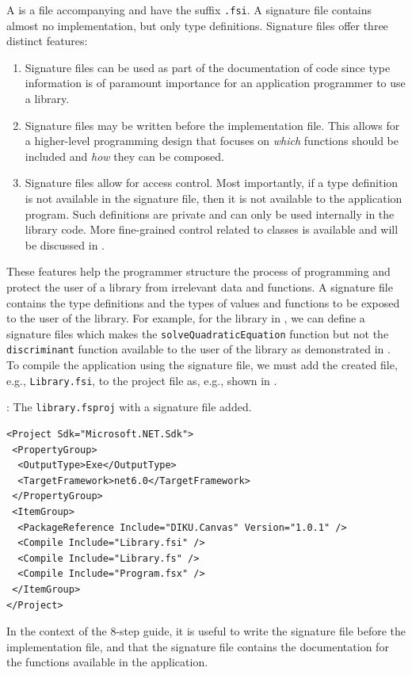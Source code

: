 \documentclass[fsharpNotes.tex]{subfiles}
\begin{document}
A  is a file accompanying  and have the suffix \lstinline[language=console]{.fsi}. A signature file contains almost no implementation, but only type definitions. Signature files offer three distinct features:
\begin{enumerate}
\item Signature files can be used as part of the documentation of code since type information is of paramount importance for an application programmer to use a library. 
\item Signature files may be written before the implementation file. This allows for a higher-level programming design that focuses on \emph{which} functions should be included and \emph{how} they can be composed.
\item Signature files allow for access control. Most importantly, if a type definition is not available in the signature file, then it is not available to the application program. Such definitions are private and can only be used internally in the library code. More fine-grained control related to classes is available and will be discussed in .
\end{enumerate}
These features help the programmer structure the process of programming and protect the user of a library from irrelevant data and functions. A signature file contains the type definitions and the types of values and functions to be exposed to the user of the library. For example, for the library in , we can define a signature files which makes the \lstinline{solveQuadraticEquation} function but not the \lstinline{discriminant} function available to the user of the library as demonstrated in .
To compile the application using the signature file, we must add the created file, e.g., \lstinline[language=console]{Library.fsi}, to the project file as, e.g., shown in .
\begin{codeNOutput}[label=libraryFsprojFSI,
  top=-5pt,
  bottom=-5pt,
  left=-2pt,
  right=-2pt,
]{: The \texttt{library.fsproj} with a signature file added.}
  \begin{lstlisting}[language=console,escapechar=§]
<Project Sdk="Microsoft.NET.Sdk">
 <PropertyGroup>
  <OutputType>Exe</OutputType>
  <TargetFramework>net6.0</TargetFramework>
 </PropertyGroup>
 <ItemGroup>
  <PackageReference Include="DIKU.Canvas" Version="1.0.1" />
  <Compile Include="Library.fsi" />
  <Compile Include="Library.fs" />
  <Compile Include="Program.fsx" />
 </ItemGroup>
</Project>
\end{lstlisting}
\end{codeNOutput}
In the context of the 8-step guide, it is useful to write the signature file before the implementation file, and that the signature file contains the documentation for the functions available in the application.
\end{document}
